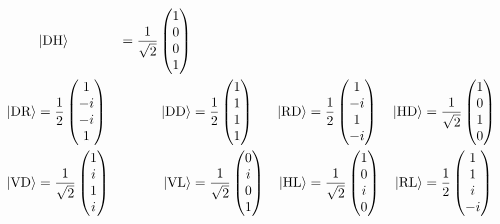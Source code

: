 \begin{align*}
    &\left|\text{DH}\right\rangle
    &=\frac{1}{\sqrt{2}}\begin{pmatrix} 1\\ 0\\ 0\\ 1\end{pmatrix}
    \\
\left|\text{DR}\right\rangle
    &=\frac{1}{2}\begin{pmatrix} 1\\-i\\-i\\ 1\end{pmatrix}
    &\left|\text{DD}\right\rangle
    &=\frac{1}{2}\begin{pmatrix} 1\\ 1\\ 1\\ 1\end{pmatrix}
    &\left|\text{RD}\right\rangle
    &=\frac{1}{2}\begin{pmatrix} 1\\-i\\ 1\\-i\end{pmatrix}
    &\left|\text{HD}\right\rangle
    &=\frac{1}{\sqrt{2}}\begin{pmatrix} 1\\ 0\\ 1\\ 0\end{pmatrix}
    \\
\left|\text{VD}\right\rangle
    &=\frac{1}{\sqrt{2}}\begin{pmatrix} 1\\ i\\ 1\\ i\end{pmatrix}
    &\left|\text{VL}\right\rangle
    &=\frac{1}{\sqrt{2}}\begin{pmatrix} 0\\ i\\ 0\\ 1\end{pmatrix}
    &\left|\text{HL}\right\rangle
    &=\frac{1}{\sqrt{2}}\begin{pmatrix} 1\\ 0\\ i\\ 0\end{pmatrix}
    &\left|\text{RL}\right\rangle
    &=\frac{1}{2}\begin{pmatrix} 1\\ 1\\ i\\-i\end{pmatrix}
\end{align*}

